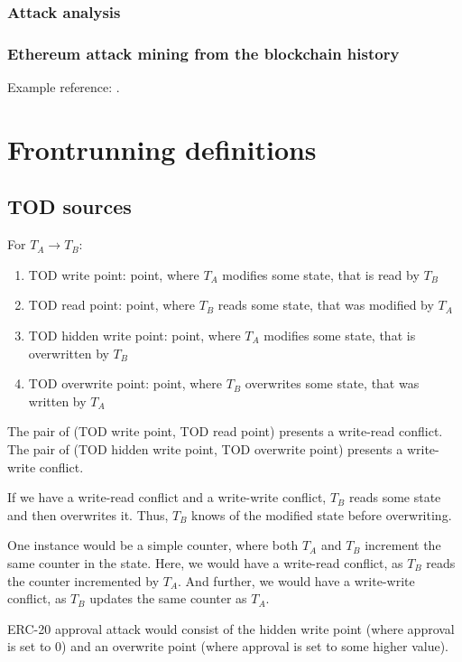 \documentclass[draft,final]{vutinfth} %
\begin{document}
\subsection{Attack analysis}

\subsection{Ethereum attack mining from the blockchain history}

Example reference: \cite{wu_time-travel_2022}.

\chapter{Frontrunning definitions}

\section{TOD sources}

For $T_A \rightarrow T_B$:

\begin{enumerate}
    \item TOD write point: point, where $T_A$ modifies some state, that is read by $T_B$
    \item TOD read point: point, where $T_B$ reads some state, that was modified by $T_A$
    \item TOD hidden write point: point, where $T_A$ modifies some state, that is overwritten by $T_B$
    \item TOD overwrite point: point, where $T_B$ overwrites some state, that was written by $T_A$
\end{enumerate}

The pair of (TOD write point, TOD read point) presents a write-read conflict. The pair of (TOD hidden write point, TOD overwrite point) presents a write-write conflict.

If we have a write-read conflict and a write-write conflict, $T_B$ reads some state and then overwrites it. Thus, $T_B$ knows of the modified state before overwriting.

One instance would be a simple counter, where both $T_A$ and $T_B$ increment the same counter in the state. Here, we would have a write-read conflict, as $T_B$ reads the counter incremented by $T_A$. And further, we would have a write-write conflict, as $T_B$ updates the same counter as $T_A$.

ERC-20 approval attack would consist of the hidden write point (where approval is set to 0) and an overwrite point (where approval is set to some higher value).
\end{document}
